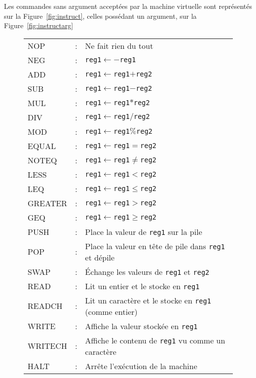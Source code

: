 \documentclass[12pt,a4paper]{article}
\begin{document}
Les commandes sans argument acceptées par la machine virtuelle sont
représentés sur la Figure~\ref{fig:instruct}, celles possédant un
argument, sur la Figure~\ref{fig:instructarg}

\begin{figure}
  \centering
  \begin{tabular}{lll}
    NOP   &:& Ne fait rien du tout\\
    NEG   &:& \texttt{reg1}$\leftarrow-$\texttt{reg1}\\
    ADD   &:& \texttt{reg1}$\leftarrow$\texttt{reg1}$+$\texttt{reg2}\\
    SUB   &:& \texttt{reg1}$\leftarrow$\texttt{reg1}$-$\texttt{reg2}\\
    MUL   &:& \texttt{reg1}$\leftarrow$\texttt{reg1}$*$\texttt{reg2}\\
    DIV   &:& \texttt{reg1}$\leftarrow$\texttt{reg1}$/$\texttt{reg2}\\
    MOD   &:& \texttt{reg1}$\leftarrow$\texttt{reg1}$\%$\texttt{reg2}\\
    EQUAL &:& \texttt{reg1}$\leftarrow$\texttt{reg1}$=$\texttt{reg2}\\
    NOTEQ &:& \texttt{reg1}$\leftarrow$\texttt{reg1}$\neq$\texttt{reg2}\\
    LESS  &:& \texttt{reg1}$\leftarrow$\texttt{reg1}$<$\texttt{reg2}\\
    LEQ   &:& \texttt{reg1}$\leftarrow$\texttt{reg1}$\leqslant$\texttt{reg2}\\
    GREATER &:& \texttt{reg1}$\leftarrow$\texttt{reg1}$>$\texttt{reg2}\\
    GEQ   &:& \texttt{reg1}$\leftarrow$\texttt{reg1}$\geqslant$\texttt{reg2}\\
    PUSH  &:& Place la valeur de \texttt{reg1} sur la pile\\
    POP   &:& Place la valeur en tête de pile dans \texttt{reg1} et dépile\\
    SWAP  &:& Échange les valeurs de \texttt{reg1} et \texttt{reg2}\\
    READ  &:& Lit un entier et le stocke en \texttt{reg1}\\
    READCH  &:& Lit un caractère et le stocke en \texttt{reg1} (comme entier)\\
    WRITE &:& Affiche la valeur stockée en \texttt{reg1}\\
    WRITECH &:& Affiche le contenu de \texttt{reg1} vu comme un caractère\\
    HALT  &:& Arrête l'exécution de la machine\\

\end{tabular}
\end{figure}
\end{document}

